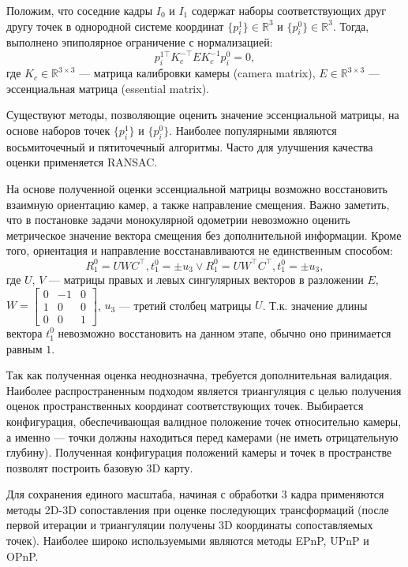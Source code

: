 Положим, что соседние кадры $I_{0}$ и $I_1$ содержат наборы соответствующих друг 
другу точек в однородной системе координат $\{p^1_i\} \in \mathbb{R}^3$ и 
$\{p^{0}_i\} \in \mathbb{R}^3$. Тогда, выполнено эпиполярное ограничение 
с нормализацией:
\begin{equation}
    p^{1\top}_i K_c^{-\top} E K_c^{-1} p^{0}_i=0,
\end{equation}
где $K_c \in \mathbb{R}^{3\times 3}$ --- матрица калибровки камеры (camera matrix), 
$E\in \mathbb{R}^{3\times 3}$ --- эссенциальная матрица (essential matrix).

Существуют методы, позволяющие оценить значение эссенциальной матрицы, на 
основе наборов точек $\{p^1_i\}$ и $\{p^{0}_i\}$. Наиболее популярными являются 
восьмиточечный и пятиточечный алгоритмы. Часто для улучшения качества оценки применяется RANSAC.

На основе полученной оценки эссенциальной матрицы возможно восстановить взаимную
ориентацию камер, а также направление смещения. Важно заметить, что в постановке 
задачи монокулярной одометрии невозможно оценить метрическое значение вектора смещения
без дополнительной информации. Кроме того, ориентация и направление восстанавливаются
не единственным способом:
\begin{equation}
R^{0}_1 = UWC^\top, t^{0}_1 = \pm u_3 \vee R^{0}_1 = UW^\top C^\top, t^{0}_1 = \pm u_3,
\end{equation}
где $U$, $V$ --- матрицы правых и левых сингулярных векторов в разложении $E$, $W = \begin{bmatrix}
    0 & -1 & 0 \\ 1 & 0 & 0 \\ 0 & 0 & 1
\end{bmatrix}$, $u_3$ --- третий столбец матрицы $U$. Т.к. значение длины вектора $t^{0}_1$
невозможно восстановить на данном этапе, обычно оно принимается равным $1$.

Так как полученная оценка неоднозначна, требуется дополнительная валидация. Наиболее
распространенным подходом является триангуляция с целью получения оценок 
пространственных координат соответствующих точек. Выбирается конфигурация, обеспечивающая
валидное положение точек относительно камеры, а именно --- точки должны находиться перед 
камерами (не иметь отрицательную глубину). Полученная конфигурация положений камеры и
точек в пространстве позволят построить базовую 3D карту.

Для сохранения единого масштаба, начиная с обработки 3 кадра применяются методы 2D-3D 
сопоставления при оценке последующих трансформаций (после первой итерации и триангуляции получены
3D координаты сопоставляемых точек). Наиболее широко используемыми являются методы 
EPnP, UPnP и OPnP. 

